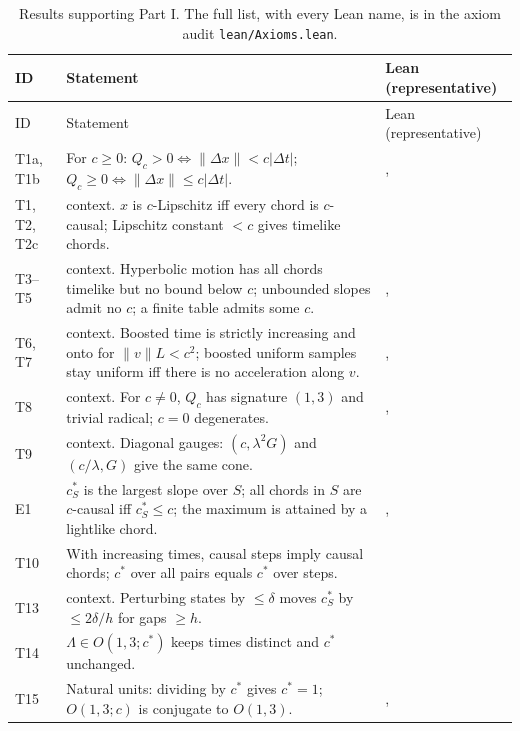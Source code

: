 \documentclass[11pt]{article}
\theoremstyle{definition}
\theoremstyle{plain}
\theoremstyle{remark}
\begin{document}
{\small
\begin{xltabular}{\linewidth}{@{}l X >{\raggedright\arraybackslash}p{4.3cm}@{}}
\caption{Results supporting Part I. The full list, with every Lean name, is in the axiom audit \texttt{lean/Axioms.lean}.}\label{tab:support}\\
\toprule
ID & Statement & Lean (representative) \\
\midrule
\endfirsthead
\toprule
ID & Statement & Lean (representative) \\
\midrule
\endhead
T1a, T1b & For $c\ge0$: $Q_c>0 \iff \|\Delta x\|<c|\Delta t|$; $Q_c\ge0\iff\|\Delta x\|\le c|\Delta t|$. & ,  \\
T1, T2, T2c & context. $x$ is $c$-Lipschitz iff every chord is $c$-causal; Lipschitz constant $<c$ gives timelike chords. &  \\
T3--T5 & context. Hyperbolic motion has all chords timelike but no bound below $c$; unbounded slopes admit no $c$; a finite table admits some $c$. & ,  \\
T6, T7 & context. Boosted time is strictly increasing and onto for $\|v\|L<c^2$; boosted uniform samples stay uniform iff there is no acceleration along $v$. & ,  \\
T8 & context. For $c\neq0$, $Q_c$ has signature $(1,3)$ and trivial radical; $c=0$ degenerates. & ,  \\
T9 & context. Diagonal gauges: $(c,\lambda^2G)$ and $(c/\lambda,G)$ give the same cone. &  \\
E1 & $c^*_S$ is the largest slope over $S$; all chords in $S$ are $c$-causal iff $c^*_S\le c$; the maximum is attained by a lightlike chord. & ,  \\
T10 & With increasing times, causal steps imply causal chords; $c^*$ over all pairs equals $c^*$ over steps. &  \\
T13 & context. Perturbing states by $\le\delta$ moves $c^*_S$ by $\le 2\delta/h$ for gaps $\ge h$. &  \\
T14 & $\Lambda\in O(1,3;c^*)$ keeps times distinct and $c^*$ unchanged. &  \\
T15 & Natural units: dividing by $c^*$ gives $c^*=1$; $O(1,3;c)$ is conjugate to $O(1,3)$. & ,  \\

\end{xltabular}}
\end{document}

